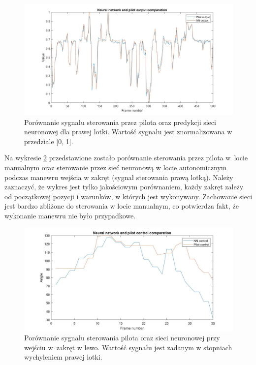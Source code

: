\documentclass[12pt, a4paper]{article}
\begin{document}
 \begin{figure}[H]
    \centering
    \includegraphics[width=1\textwidth]{nnvskac}
    \caption{Porównanie sygnału sterowania przez pilota oraz predykcji sieci neuronowej dla prawej lotki. Wartość sygnału jest znormalizowana w przedziale [0, 1].}
    \label{fig:aivskac}
\end{figure}

Na wykresie \ref{fig:nnturn} przedstawione zostało porównanie sterowania przez pilota w~locie manualnym oraz sterowanie przez sieć neuronową w locie autonomicznym podczas manewru wejścia w zakręt (sygnał sterowania prawą lotką). Należy zaznaczyć, że wykres jest tylko jakościowym porównaniem, każdy zakręt zależy od początkowej pozycji i warunków, w których jest wykonywany. Zachowanie sieci jest bardzo zbliżone do sterowania w locie manualnym, co potwierdza fakt, że wykonanie manewru nie było przypadkowe. 


 \begin{figure}[H]
    \centering
    \includegraphics[width=1\textwidth]{nnturn}
    \caption{Porównanie sygnału sterowania pilota oraz sieci neuronowej przy wejściu w~zakręt w lewo. Wartość sygnału jest zadanym w stopniach wychyleniem prawej lotki.}
    \label{fig:nnturn}
\end{figure}
\end{document}
